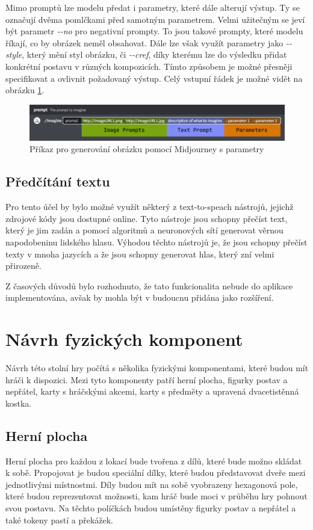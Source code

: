 Mimo promptů lze modelu předat i parametry, které dále alterují výstup. Ty se označují dvěma pomlčkami před samotným parametrem. Velmi užitečným se jeví být parametr \textit{{-}{-}no} pro negativní prompty. To jsou takové prompty, které modelu říkají, co by obrázek neměl obsahovat. Dále lze však využít parametry jako \textit{{-}{-}style}, který mění styl obrázku, či \textit{{-}{-}cref}, díky kterému lze do výsledku přidat konkrétní postavu v různých kompozicích. Tímto způsobem je možné přesněji specifikovat a ovlivnit požadovaný výstup. Celý vstupní řádek je možné vidět na obrázku \ref{fig:mj_prompts_params}.

\begin{figure}[H]
    \centering
    \includegraphics[width=1\textwidth]{resources/figures/midjourney_prompts_params.png}
    \caption{Příkaz pro generování obrázku pomocí Midjourney s parametry\cite{midjourney}}
    \label{fig:mj_prompts_params}
\end{figure}

\subsection{Předčítání textu}
Pro tento účel by bylo možné využít některý z text-to-speach nástrojů, jejichž zdrojové kódy jsou dostupné online. Tyto nástroje jsou schopny přečíst text, který je jim zadán a pomocí algoritmů a neuronových sítí generovat věrnou napodobeninu lidského hlasu. Výhodou těchto nástrojů je, že jsou schopny přečíst texty v mnoha jazycích a že jsou schopny generovat hlas, který zní velmi přirozeně.

Z časových důvodů bylo rozhodnuto, že tato funkcionalita nebude do aplikace implementována, avšak by mohla být v budoucnu přidána jako rozšíření.

\section{Návrh fyzických komponent}
Návrh této stolní hry počítá s několika fyzickými komponentami, které budou mít hráči k dispozici. Mezi tyto komponenty patří herní plocha, figurky postav a nepřátel, karty s hráčskými akcemi, karty s předměty a upravená dvacetistěnná kostka.

\subsection{Herní plocha}
Herní plocha pro každou z lokací bude tvořena z dílů, které bude možno skládat k sobě. Propojovat je budou speciální dílky, které budou představovat dveře mezi jednotlivými místnostmi. Díly budou mít na sobě vyobrazeny hexagonová pole, které budou reprezentovat možnosti, kam hráč bude moci v průběhu hry pohnout svou postavu. Na těchto políčkách budou umístěny figurky postav a nepřátel a také tokeny pastí a překážek.

